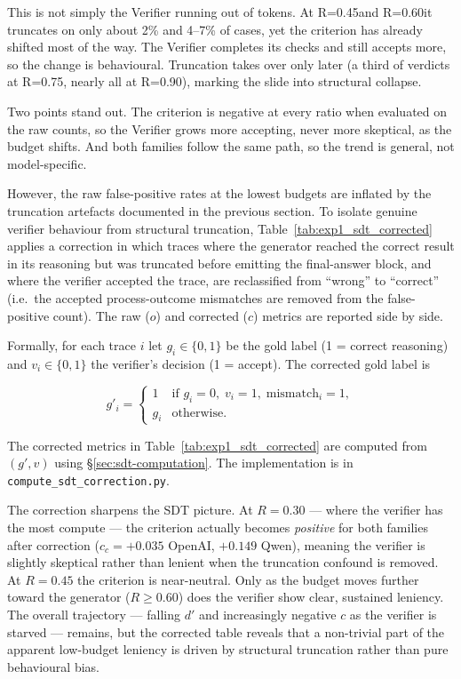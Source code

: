 \documentclass[12pt, a4paper, oneside]{report}
\begin{document}
This is not simply the Verifier running out of tokens. At R=0.45and R=0.60it truncates on only 
about 2\% and 4–7\% of cases, yet the criterion has already shifted most of the way. The Verifier 
completes its checks and still accepts more, so the change is behavioural. Truncation takes over only 
later (a third of verdicts at R=0.75, nearly all at R=0.90), marking the slide into structural collapse.

Two points stand out. The criterion is negative at every ratio when evaluated on the raw
 counts, so the Verifier grows more accepting, never more skeptical, as the budget shifts.
 And both families follow the same path, so the trend is general, not model-specific.

However, the raw false-positive rates at the lowest budgets are inflated by the
truncation artefacts documented in the previous section. To isolate genuine verifier
behaviour from structural truncation, Table~\ref{tab:exp1_sdt_corrected} applies a correction in which traces where the generator reached
the correct result in its reasoning but was truncated before emitting the final-answer
block, and where the verifier accepted the trace, are reclassified from ``wrong'' to
``correct'' (i.e.\ the accepted process-outcome mismatches are removed from the
false-positive count). The raw ($o$) and corrected ($c$) metrics are reported side by side.

Formally, for each trace $i$ let $g_i \in \{0, 1\}$ be the gold label (1 = correct reasoning) and $v_i \in \{0, 1\}$ the verifier's decision (1 = accept).  The corrected gold label is

\[
g'_i = \begin{cases}
1 & \text{if } g_i = 0,\; v_i = 1,\; \text{mismatch}_i = 1,\\
g_i & \text{otherwise}.
\end{cases}
\]

The corrected metrics in Table~\ref{tab:exp1_sdt_corrected} are computed from $(g', v)$ using \S\ref{sec:sdt-computation}.  The implementation is in \texttt{compute\_sdt\_correction.py}.

The correction sharpens the SDT picture. At $R=0.30$ --- where the verifier has the
most compute --- the criterion actually becomes \emph{positive} for both families after
correction ($c_c = +0.035$ OpenAI, $+0.149$ Qwen), meaning the verifier is slightly
skeptical rather than lenient when the truncation confound is removed. At $R=0.45$ the
criterion is near-neutral. Only as the budget moves further toward the generator
($R \ge 0.60$) does the verifier show clear, sustained leniency. The overall trajectory
--- falling $d'$ and increasingly negative $c$ as the verifier is starved --- remains,
but the corrected table reveals that a non-trivial part of the apparent low-budget
leniency is driven by structural truncation rather than pure behavioural bias.
\end{document}
